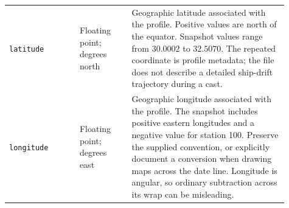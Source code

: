 \documentclass[11pt,letterpaper]{article}
\newcommand{\field}[1]{\nolinkurl{#1}}
\begin{document}
\begin{longtable}{L{0.23\linewidth}L{0.17\linewidth}L{0.51\linewidth}}
\addlinespace
\field{latitude} & Floating point; degrees north & Geographic latitude associated with the profile. Positive values are north of the equator. Snapshot values range from $30.0002$ to $32.5070$. The repeated coordinate is profile metadata; the file does not describe a detailed ship-drift trajectory during a cast. \\
\addlinespace
\field{longitude} & Floating point; degrees east & Geographic longitude associated with the profile. The snapshot includes positive eastern longitudes and a negative value for station 100. Preserve the supplied convention, or explicitly document a conversion when drawing maps across the date line. Longitude is angular, so ordinary subtraction across its wrap can be misleading. \\
\end{longtable}
\normalsize

\end{document}
